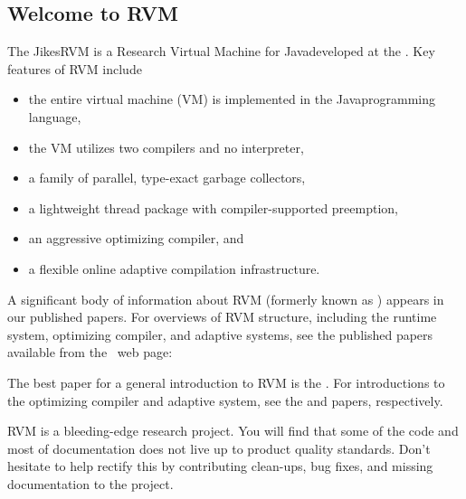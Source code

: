 \subsection {Welcome to RVM}

The Jikes\trademark RVM is a Research Virtual Machine for
Java\trademark developed at the 
.  Key
features of RVM include
\begin{itemize}
\item the entire virtual machine (VM) is implemented in the
  Java\trademark  programming language,
\item the VM utilizes two compilers and no interpreter,
\item a family of parallel, type-exact garbage collectors,
\item a lightweight thread package with compiler-supported preemption,
\item an aggressive optimizing compiler, and 
\item a flexible online adaptive compilation infrastructure.
\end{itemize}

A significant body of information about RVM 
(formerly known as 
\xlink{\jp}{\JalapenoHomeURL}) appears 
in our published
papers.  For overviews of RVM structure, including the runtime system,
optimizing compiler, and adaptive systems, see the published papers
available from the \jp\ web page:
\begin{quote}
\xlink{{\RVMPubsURL}}{\RVMPubsURL}
\end{quote}

The best paper for a general introduction to RVM is 
the 
.  
For introductions to the
optimizing compiler and adaptive system, see the 
{\JavaGrandePaperURL}
 and 
{\OOPSLAPaperURL}  
papers, respectively.

RVM is a bleeding-edge research project.  You will find that
some of the code and most of documentation does not live up to product  
quality standards. Don't hesitate to help rectify this by
contributing clean-ups, bug fixes, and missing documentation to 
the project.  
